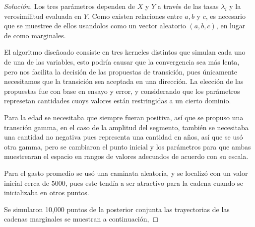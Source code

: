 \documentclass{article}
\begin{document}
\begin{enumerate}
    \begin{proof}[Solución]
        Los tres parámetros dependen de $X$ y $Y$ a través de las tasas $\lambda_i$ y la
        verosimilitud evaluada en $Y$. Como existen relaciones entre $a,b$ y $c$, es necesario
        que se muestree de ellos usandolos como un vector aleatorio $(a,b,c)$, en lugar de
        como marginales. 

        El algoritmo diseñoado consiste en tres kerneles distintos que simulan cada uno de
        una de las variables, esto podría causar que la convergencia sea más lenta, pero nos
        facilita la decisión de las propuestas de transición, pues únicamente necesitamos
        que la transición sea aceptada en una dirección. La elección de las propuestas fue 
        con base en ensayo y error, y considerando que los parámetros represetan cantidades
        cuoys valores están restringidas a un cierto dominio. 
        
        Para la edad se 
        necesitaba que siempre fueran positiva, así que se propuso una transción gamma, en el caso
        de la amplitud del segmento, también se necesitaba una cantidad no negativa pues 
        representa una cantidad en años, así que se usó otra gamma, pero se cambiaron el punto
        inicial y los parámetros para que ambas muestrearan el espacio en rangos de valores
        adecuados de acuerdo con su escala.

        Para el gasto promedio se usó una caminata aleatoria, y se localizó con un valor inicial
        cerca de 5000, pues este tendía a ser atractivo para la cadena cuando se inicializaba 
        en otros puntos.

        Se simularon 10,000 puntos de la posterior conjunta
        las trayectorias de las cadenas marginales se muestran a continuación,


\end{proof}
\end{enumerate}
\end{document}
